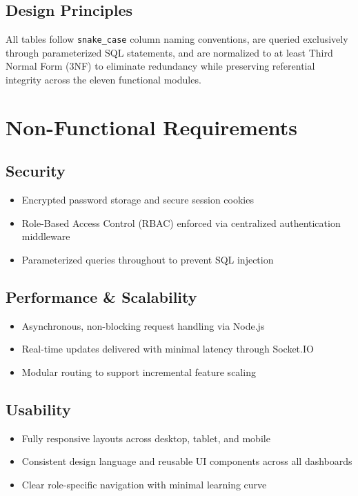 \documentclass[11pt,a4paper]{report}
\begin{document}
\section{Design Principles}
All tables follow \texttt{snake\_case} column naming conventions, are queried exclusively through parameterized SQL statements, and are normalized to at least Third Normal Form (3NF) to eliminate redundancy while preserving referential integrity across the eleven functional modules.

\chapter{Non-Functional Requirements}

\section{Security}
\begin{itemize}[leftmargin=1.3em]
  \item Encrypted password storage and secure session cookies
  \item Role-Based Access Control (RBAC) enforced via centralized authentication middleware
  \item Parameterized queries throughout to prevent SQL injection
\end{itemize}

\section{Performance \& Scalability}
\begin{itemize}[leftmargin=1.3em]
  \item Asynchronous, non-blocking request handling via Node.js
  \item Real-time updates delivered with minimal latency through Socket.IO
  \item Modular routing to support incremental feature scaling
\end{itemize}

\section{Usability}
\begin{itemize}[leftmargin=1.3em]
  \item Fully responsive layouts across desktop, tablet, and mobile
  \item Consistent design language and reusable UI components across all dashboards
  \item Clear role-specific navigation with minimal learning curve
\end{itemize}
\end{document}
